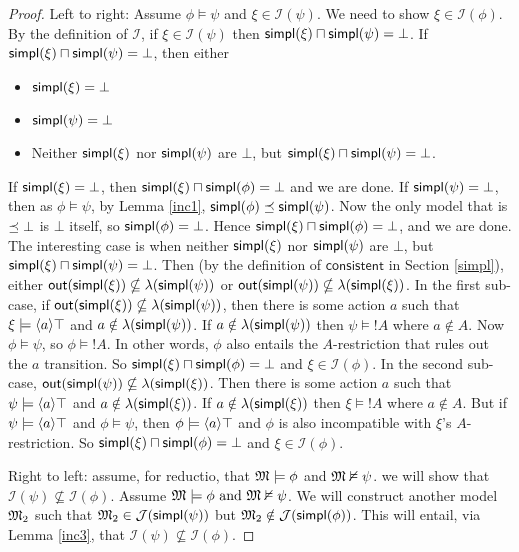 \begin{proof}

Left to right: Assume $\phi \models \psi$ and $\xi \in \mathcal{I}(\psi)$.  
We need to show $\xi \in \mathcal{I}(\phi)$.
By the definition of $\mathcal{I}$, if $\xi \in \mathcal{I}(\psi)$ then
$\mathsf{simpl}(\xi) \sqcap \mathsf{simpl}(\psi) = \bot$.
If $\mathsf{simpl}(\xi) \sqcap \mathsf{simpl}(\psi) = \bot$, then either
\begin{itemize}
\item $\mathsf{simpl}(\xi) = \bot$
\item $\mathsf{simpl}(\psi) = \bot$
\item Neither $\mathsf{simpl}(\xi)$ nor $\mathsf{simpl}(\psi)$ are $\bot$, but $\mathsf{simpl}(\xi) \sqcap \mathsf{simpl}(\psi) = \bot$.
\end{itemize}
If $\mathsf{simpl}(\xi) = \bot$, then $\mathsf{simpl}(\xi) \sqcap \mathsf{simpl}(\phi) = \bot$ and we are done.
If $\mathsf{simpl}(\psi) = \bot$, then as $\phi \models \psi$, by Lemma \ref{inc1}, $\mathsf{simpl}(\phi) \preceq \mathsf{simpl}(\psi)$.
Now the only model that is $\preceq \bot$ is $\bot$ itself, so $\mathsf{simpl}(\phi) = \bot$. Hence $\mathsf{simpl}(\xi) \sqcap \mathsf{simpl}(\phi) = \bot$, and we are done.
The interesting case is when neither $\mathsf{simpl}(\xi)$ nor $\mathsf{simpl}(\psi)$ are $\bot$, but $\mathsf{simpl}(\xi) \sqcap \mathsf{simpl}(\psi) = \bot$.
Then (by the definition of $\mathsf{consistent}$ in Section \ref{simpl}), either $\mathsf{out}(\mathsf{simpl}(\xi)) \nsubseteq \lambda(\mathsf{simpl}(\psi))$ or $\mathsf{out}(\mathsf{simpl}(\psi)) \nsubseteq \lambda(\mathsf{simpl}(\xi))$.
In the first sub-case, if  $\mathsf{out}(\mathsf{simpl}(\xi)) \nsubseteq \lambda(\mathsf{simpl}(\psi))$, then there is some action $a$ such that $\xi \models \langle a \rangle \top$ and $a \notin \lambda(\mathsf{simpl}(\psi))$.
If $a \notin \lambda(\mathsf{simpl}(\psi))$ then $\psi \models ! A$ where $a \notin A$.
Now $\phi \models \psi$, so $\phi \models ! A$.
In other words, $\phi$ also entails the $A$-restriction that rules out the $a$ transition.
So $\mathsf{simpl}(\xi) \sqcap \mathsf{simpl}(\phi) = \bot$ and $\xi \in \mathcal{I}(\phi)$.
In the second sub-case, $\mathsf{out}(\mathsf{simpl}(\psi)) \nsubseteq \lambda(\mathsf{simpl}(\xi))$.
Then there is some action $a$ such that $\psi \models \langle a \rangle \top$ and $a \notin \lambda(\mathsf{simpl}(\xi))$.
If $a \notin \lambda(\mathsf{simpl}(\xi))$ then $\xi \models ! A$ where $a \notin A$.
But if $\psi \models \langle a \rangle \top$ and $\phi \models \psi$, then $\phi \models \langle a \rangle \top$ and $\phi$ is also incompatible with $\xi$'s $A$-restriction.
So $\mathsf{simpl}(\xi) \sqcap \mathsf{simpl}(\phi) = \bot$ and $\xi \in \mathcal{I}(\phi)$.

Right to left: assume, for reductio, that $\frak{M} \models \phi$ and $\frak{M} \nvDash
\psi$. we will show that $\mathcal{I}(\psi) \nsubseteq \mathcal{I}(\phi)$.
Assume $\frak{M} \models \phi \mbox{ and } \frak{M} \nvDash \psi$. We will construct
another model $\frak{M}_2$ such that $\frak{M}_2 \in \mathcal{J}(\mathsf{simpl}(\psi))$ but $\frak{M}_2
\notin \mathcal{J}(\mathsf{simpl}(\phi))$.  This will entail, via Lemma \ref{inc3}, that
$\mathcal{I}(\psi) \nsubseteq \mathcal{I}(\phi)$.


\end{proof}
